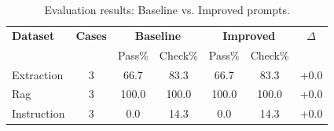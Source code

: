 \begin{table}[h]
\centering
\caption{Evaluation results: Baseline vs. Improved prompts.}
\label{tab:eval-results}
\begin{tabular}{@{}lcccccc@{}}
\toprule
\textbf{Dataset} & \textbf{Cases} & \multicolumn{2}{c}{\textbf{Baseline}} & \multicolumn{2}{c}{\textbf{Improved}} & \textbf{$\Delta$} \\
 & & Pass\% & Check\% & Pass\% & Check\% & \\
\midrule
Extraction & 3 & 66.7 & 83.3 & 66.7 & 83.3 & +0.0 \\
Rag & 3 & 100.0 & 100.0 & 100.0 & 100.0 & +0.0 \\
Instruction & 3 & 0.0 & 14.3 & 0.0 & 14.3 & +0.0 \\
\bottomrule
\end{tabular}
\end{table}
